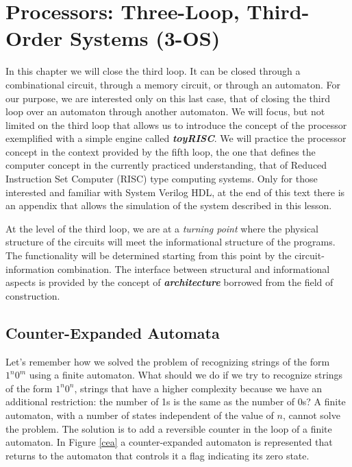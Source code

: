\chapter{Processors: Three-Loop, Third-Order Systems (3-OS)}\label{lect4}
\localtoc


In this chapter we will  close the third loop. It can be closed through a combinational circuit, through a memory circuit, or through an automaton. For our purpose, we are interested only on this last case, that of closing the third loop over an automaton through another automaton. We will focus, but not limited  on the third loop that allows us to introduce the concept of the processor exemplified with a simple engine called {\bf {\em toyRISC}}. We will practice the processor concept in the context provided by the fifth loop, the one that defines the computer concept in the currently practiced understanding, that of Reduced Instruction Set Computer (RISC) type computing systems. Only for those interested and familiar with System Verilog HDL, at the end of this text there is an appendix that allows the simulation of the system described in this lesson.

At the level of the third loop, we are at a {\em turning point} where the physical structure of the circuits will meet the informational structure of the programs. The functionality will be determined starting from this point by the circuit-information combination. The interface between structural and informational aspects is provided by the concept of {\bf {\em architecture}} borrowed from the field of construction.

\section{Counter-Expanded Automata}

Let's remember how we solved the problem of recognizing strings of the form $1^n0^m$ using a finite automaton. What should we do if we try to recognize strings of the form $1^n0^n$, strings that have a higher complexity because we have an additional restriction: the number of 1s is the same as the number of 0s? A finite automaton, with a number of states independent of the value of $n$, cannot solve the problem. The solution is to add a reversible counter in the loop of a finite automaton. In Figure \ref{cea} a counter-expanded automaton is represented that returns to the automaton that controls it a flag indicating its zero state.


